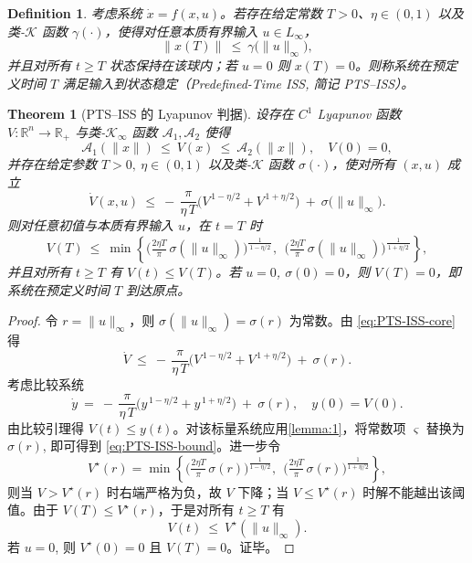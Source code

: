 \documentclass[pdflatex,sn-mathphys-num]{sn-jnl}%
\theoremstyle{thmstyleone}%
\newtheorem{theorem}{Theorem}%
\theoremstyle{thmstyletwo}%
\theoremstyle{thmstylethree}%
\newtheorem{definition}{Definition}%
\begin{document}
\begin{definition}\label{def:PTS-ISS}
	考虑系统 $\dot x = f(x,u)$。若存在给定常数 $T>0$、$\eta\in(0,1)$ 以及类-$\mathcal{K}$ 函数 $\gamma(\cdot)$，使得对任意本质有界输入 $u\in L_\infty$，
	\[
	\|x(T)\|\ \le\ \gamma\big(\|u\|_\infty\big),
	\]
	并且对所有 $t\ge T$ 状态保持在该球内；若 $u= 0$ 则 $x(T)=0$。则称系统在预定义时间 $T$ 满足输入到状态稳定（Predefined-Time ISS, 简记 PTS--ISS）。
	\end{definition}
	
	\begin{theorem}[PTS--ISS 的 Lyapunov 判据]\label{thm:PTS-ISS}
	设存在 $C^1$ Lyapunov 函数 $V:\mathbb{R}^n\to\mathbb{R}_+$ 与类-$\mathcal{K}_\infty$ 函数 $\mathcal{A}_1,\mathcal{A}_2$ 使得
	\[
	\mathcal{A}_1(\|x\|)\ \le\ V(x)\ \le\ \mathcal{A}_2(\|x\|),\quad V(0)=0,
	\]
	并存在给定参数 $T>0,\ \eta\in(0,1)$ 以及类-$\mathcal{K}$ 函数 $\sigma(\cdot)$，使对所有 $(x,u)$ 成立
	\begin{equation}\label{eq:PTS-ISS-core}
	\dot V(x,u)\ \le\ -\,\frac{\pi}{\eta\,T}\Big(V^{\,1-{\eta}/{2}}+V^{\,1+{\eta}/{2}}\Big)\ +\ \sigma\big(\|u\|_\infty\big).
	\end{equation}
	则对任意初值与本质有界输入 $u$，在 $t=T$ 时
	\begin{equation}\label{eq:PTS-ISS-bound}
	V(T)\ \le\ \min\!\left\{
	\Big(\tfrac{2\eta T}{\pi}\,\sigma(\|u\|_\infty)\Big)^{\!\frac{1}{\,1-{\eta}/{2}\,}},
	\ \ 
	\Big(\tfrac{2\eta T}{\pi}\,\sigma(\|u\|_\infty)\Big)^{\!\frac{1}{\,1+{\eta}/{2}\,}}
	\right\},
	\end{equation}
	并且对所有 $t\ge T$ 有 $V(t)\le V(T)$。若 $u= 0$, $\sigma(0)=0$，则 $V(T)=0$，即系统在预定义时间 $T$ 到达原点。
	\end{theorem}
	
	\begin{proof}
	令 $r=\|u\|_\infty$，则 $\sigma(\|u\|_\infty)=\sigma(r)$ 为常数。由 \cref{eq:PTS-ISS-core} 得
	\[
	\dot V\ \le\ -\,\frac{\pi}{\eta\,T}\Big(V^{\,1-{\eta}/{2}}+V^{\,1+{\eta}/{2}}\Big)\ +\ \sigma(r).
	\]
	考虑比较系统
	\[
	\dot y\ =\ -\,\frac{\pi}{\eta\,T}\Big(y^{\,1-{\eta}/{2}}+y^{\,1+{\eta}/{2}}\Big)\ +\ \sigma(r),\quad y(0)=V(0).
	\]
	由比较引理得 $V(t)\le y(t)$。对该标量系统应用\cref{lemma:1}，将常数项 $\varsigma$ 替换为 $\sigma(r)$, 即可得到 \cref{eq:PTS-ISS-bound}。进一步令
\[
V^\star(r)=\min\!\left\{
\Big(\tfrac{2\eta T}{\pi}\,\sigma(r)\Big)^{\!\frac{1}{1-{\eta}/{2}}},
\ \ 
\Big(\tfrac{2\eta T}{\pi}\,\sigma(r)\Big)^{\!\frac{1}{1+{\eta}/{2}}}
\right\},
\]
则当 $V>V^\star(r)$ 时右端严格为负，故 $V$ 下降；当 $V\le V^\star(r)$ 时解不能越出该阈值。由于 $V(T)\le V^\star(r)$，于是对所有 $t\ge T$ 有
\[
V(t)\ \le\ V^\star(\|u\|_\infty).
\]
若 $u=0$, 则 $V^\star(0)=0$ 且 $V(T)=0$。证毕。

	\end{proof}
	
\end{document}
